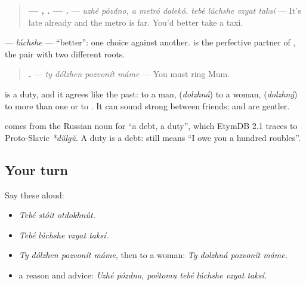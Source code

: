\begin{grammarlens}[title={Grammar Lens: \ru{лучше}, it is better}]
\begin{quote}
\textbf{—  ,   . —    .} — \emph{uzhé pózdno, a metró dalekó. tebé lúchshe vzyat taksí} — It's late already and the metro is far. You'd better take a taxi.
\end{quote}

\textbf{} — \emph{lúchshe} — \textquotedblleft{}better\textquotedblright{}: one choice against another. \textbf{} is the perfective partner of \emph{}, the pair with two different roots.
\end{grammarlens}

\begin{grammarlens}[title={Grammar Lens: \ru{ты} \ru{должен}, you must}]
\begin{quote}
\textbf{   .} — \emph{ty dólzhen pozvonít máme} — You must ring Mum.
\end{quote}

\textbf{} is a duty, and it agrees like the past: \textbf{} to a man, \textbf{} (\emph{dolzhná}) to a woman, \textbf{} (\emph{dolzhný}) to more than one or to \emph{}. It can sound strong between friends; \textbf{} and \textbf{} are gentler.
\end{grammarlens}

\begin{cousinweb}
\textbf{} comes from the Russian noun for \textquotedblleft{}a debt, a duty\textquotedblright{}, which EtymDB 2.1 traces to Proto-Slavic \emph{*dŭlgŭ}. A duty is a debt: \emph{    } still means \textquotedblleft{}I owe you a hundred roubles\textquotedblright{}.
\end{cousinweb}

\subsection*{Your turn}
Say these aloud:

\begin{itemize}
\raggedright
  \item \emph{Tebé stóit otdokhnút.}
  \item \emph{Tebé lúchshe vzyat taksí.}
  \item \emph{Ty dólzhen pozvonít máme}, then to a woman: \emph{Ty dolzhná pozvonít máme.}
  \item a reason and advice: \emph{Uzhé pózdno, poétomu tebé lúchshe vzyat taksí.}
\end{itemize}

